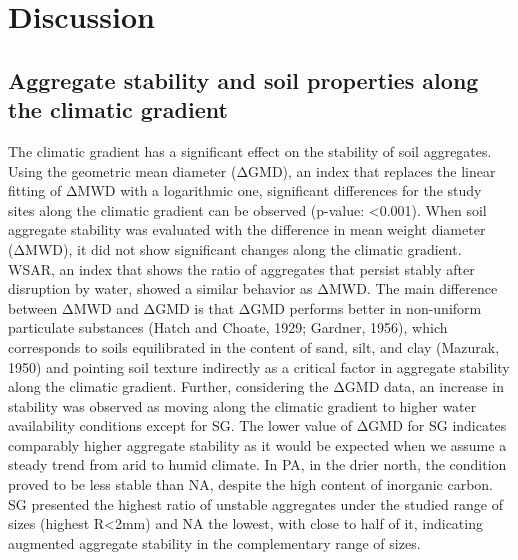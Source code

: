 \section{Discussion}

\subsection{Aggregate stability and soil properties along the climatic gradient}

The climatic gradient has a significant effect on the stability of soil aggregates. Using the geometric mean diameter (ΔGMD), an index that replaces the linear fitting of ΔMWD with a logarithmic one, significant differences for the study sites along the climatic gradient can be observed (p-value: <0.001). When soil aggregate stability was evaluated with the difference in mean weight diameter (ΔMWD), it did not show significant changes along the climatic gradient. WSAR, an index that shows the ratio of aggregates that persist stably after disruption by water, showed a similar behavior as ΔMWD. The main difference between ΔMWD and ΔGMD is that ΔGMD performs better in non-uniform particulate substances (Hatch and Choate, 1929; Gardner, 1956), which corresponds to soils equilibrated in the content of sand, silt, and clay (Mazurak, 1950) and pointing soil texture indirectly as a critical factor in aggregate stability along the climatic gradient. Further, considering the ΔGMD data, an increase in stability was observed as moving along the climatic gradient to higher water availability conditions except for SG. The lower value of ΔGMD for SG indicates comparably higher aggregate stability as it would be expected when we assume a steady trend from arid to humid climate. In PA, in the drier north, the condition proved to be less stable than NA, despite the high content of inorganic carbon. SG presented the highest ratio of unstable aggregates under the studied range of sizes (highest R<2mm) and NA the lowest, with close to half of it, indicating augmented aggregate stability in the complementary range of sizes.

